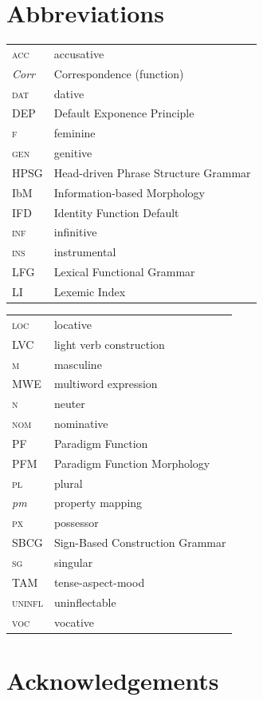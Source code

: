\documentclass[output=paper,colorlinks,citecolor=brown]{langscibook}
\begin{document}
 
\section*{Abbreviations}
\begin{tabularx}{.45\textwidth}{lQ}
\textsc{acc} & accusative \\
\textit{Corr} & Correspondence (function) \\
\textsc{dat} & dative \\
DEP & Default Exponence Principle \\
\textsc{f} & feminine \\
\textsc{gen} & genitive \\
HPSG & Head-driven Phrase Structure Grammar \\
IbM & Information-based Morphology \\
IFD & Identity Function Default \\
\textsc{inf} & infinitive \\
\textsc{ins} & instrumental \\
LFG & Lexical Functional Grammar \\
LI & Lexemic Index \\
\end{tabularx}
\begin{tabularx}{.45\textwidth}{lQ}
\textsc{loc} & locative \\
LVC & light verb construction \\
\textsc{m} & masculine \\
MWE & multiword expression \\
\textsc{n} & neuter \\
\textsc{nom} & nominative \\
PF & Paradigm Function \\
PFM & Paradigm Function Morphology \\
\textsc{pl} & plural \\
\textit{pm} & property mapping \\
\textsc{px} & possessor \\
SBCG & Sign-Based Construction Grammar \\
\textsc{sg} & singular \\
TAM & tense-aspect-mood \\
\textsc{uninfl} & uninflectable \\
\textsc{voc} & vocative \\
\end{tabularx}


\section*{Acknowledgements}
\end{document}
